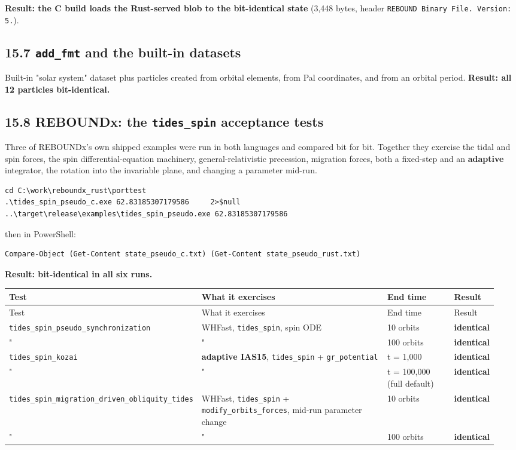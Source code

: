 \documentclass[11pt]{article}
\begin{document}
\textbf{Result: the C build loads the Rust-served blob to the bit-identical state} (3,448 bytes, header \texttt{REBOUND Binary File. Version: 5.}).

\subsection{15.7 \texttt{add\_fmt} and the built-in datasets}

Built-in "solar system" dataset plus particles created from orbital elements, from Pal coordinates, and from an orbital period. \textbf{Result: all 12 particles bit-identical.}

\subsection{15.8 REBOUNDx: the \texttt{tides\_spin} acceptance tests}

Three of REBOUNDx's own shipped examples were run in both languages and compared bit for bit. Together they exercise the tidal and spin forces, the spin differential-equation machinery, general-relativistic precession, migration forces, both a fixed-step and an \textbf{adaptive} integrator, the rotation into the invariable plane, and changing a parameter mid-run.

\begin{lstlisting}
cd C:\work\reboundx_rust\porttest
.\tides_spin_pseudo_c.exe 62.83185307179586     2>$null
..\target\release\examples\tides_spin_pseudo.exe 62.83185307179586
\end{lstlisting}

then in PowerShell:

\begin{lstlisting}
Compare-Object (Get-Content state_pseudo_c.txt) (Get-Content state_pseudo_rust.txt)
\end{lstlisting}

\textbf{Result: bit-identical in all six runs.}

\begin{longtable}{L{0.270\linewidth}L{0.426\linewidth}L{0.156\linewidth}L{0.098\linewidth}}
\toprule
Test & What it exercises & End time & Result \\
\midrule
\endfirsthead
\toprule
Test & What it exercises & End time & Result \\
\midrule
\endhead
\texttt{tides\_spin\_pseudo\_synchronization} & WHFast, \texttt{tides\_spin}, spin ODE & 10 orbits & \textbf{identical} \\
" & " & 100 orbits & \textbf{identical} \\
\texttt{tides\_spin\_kozai} & \textbf{adaptive IAS15}, \texttt{tides\_spin} + \texttt{gr\_potential} & t = 1,000 & \textbf{identical} \\
" & " & t = 100,000 (full default) & \textbf{identical} \\
\texttt{tides\_spin\_migration\_driven\_obliquity\_tides} & WHFast, \texttt{tides\_spin} + \texttt{modify\_orbits\_forces}, mid-run parameter change & 10 orbits & \textbf{identical} \\
" & " & 100 orbits & \textbf{identical} \\
\bottomrule
\end{longtable}
\end{document}
